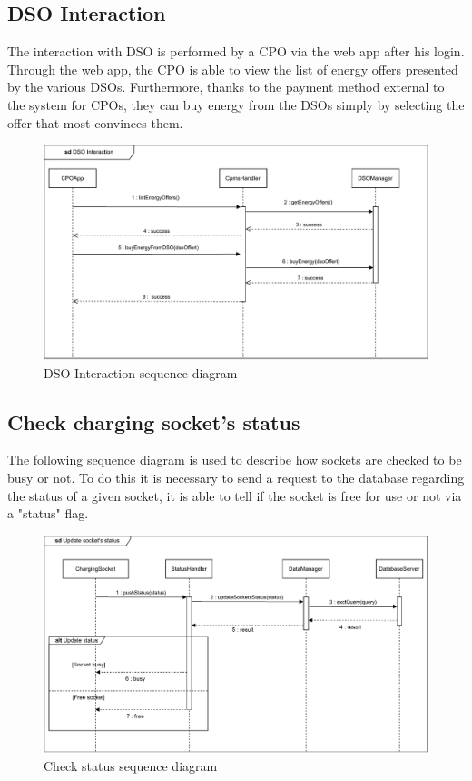 \subsection{DSO Interaction}
The interaction with DSO is performed by a CPO via the web app after his login. Through the web app, the CPO is able to view the list of energy offers presented by the various DSOs. Furthermore, thanks to the payment method external to the system for CPOs, they can buy energy from the DSOs simply by selecting the offer that most convinces them.
\begin{figure}[H]
    \centering
    \includegraphics[width=\textwidth]{images/sd_DSO.pdf}
    \caption{DSO Interaction sequence diagram}
    \label{fig:endUserPayment}
\end{figure}
\subsection{Check charging socket's status}
The following sequence diagram is used to describe how sockets are checked to be busy or not. To do this it is necessary to send a request to the database regarding the status of a given socket, it is able to tell if the socket is free for use or not via a "status" flag.
\begin{figure}[H]
    \centering
    \includegraphics[width=\textwidth]{images/sd_status.pdf}
    \caption{Check status sequence diagram}
    \label{fig:checkStatus}
\end{figure}
